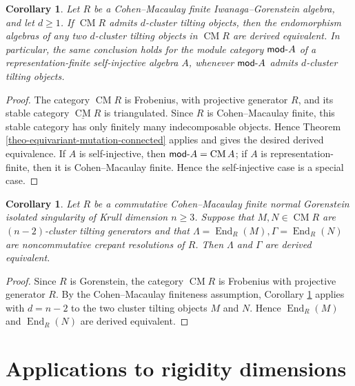 \documentclass[12pt]{article}
\theoremstyle{plain}
\newtheorem{Coro}[Def]{Corollary}
\theoremstyle{definition}
\DeclareMathOperator{\End}{End}
\def\modcat#1{{\sf mod}\mbox{-}{#1}}
\renewcommand{\geq}{\geqslant}
\begin{document}
\begin{Coro}\label{coro-finite-frobenius-derived-equivalence}
Let \(R\) be a Cohen--Macaulay finite Iwanaga--Gorenstein algebra, and let
\(d\geq1\).  If \(\operatorname{CM} R\) admits \(d\)-cluster tilting objects,
then the endomorphism algebras of any two \(d\)-cluster tilting objects in
\(\operatorname{CM} R\) are derived equivalent.  In particular, the same
conclusion holds for the module category \(\modcat{A}\) of a
representation-finite self-injective algebra \(A\), whenever \(\modcat{A}\)
admits \(d\)-cluster tilting objects.
\end{Coro}

\begin{proof}
The category \(\operatorname{CM} R\) is Frobenius, with projective generator
\(R\), and its stable category \(\underline{\operatorname{CM}}R\) is
triangulated.  Since \(R\) is Cohen--Macaulay finite, this stable category has
only finitely many indecomposable objects.  Hence Theorem
\ref{theo-equivariant-mutation-connected} applies and gives the desired
derived equivalence.  If \(A\) is self-injective, then
\(\modcat{A}=\operatorname{CM} A\); if \(A\) is representation-finite, then it
is Cohen--Macaulay finite.  Hence the self-injective case is a special case.
\end{proof}

\begin{Coro}\label{coro-CMfinite-isolated-NCCR}
Let \(R\) be a commutative Cohen--Macaulay finite normal Gorenstein isolated
singularity of Krull dimension \(n\geq3\).  Suppose that \(M,N\in
\operatorname{CM}R\) are \((n-2)\)-cluster tilting generators and that
\(
\Lambda=\End_R(M), \Gamma=\End_R(N)
\)
are noncommutative crepant resolutions of \(R\).  Then \(\Lambda\) and
\(\Gamma\) are derived equivalent.
\end{Coro}

\begin{proof}
Since \(R\) is Gorenstein, the category \(\operatorname{CM}R\) is Frobenius
with projective generator \(R\).  By the Cohen--Macaulay finiteness
assumption, Corollary \ref{coro-finite-frobenius-derived-equivalence} applies
with \(d=n-2\) to the two cluster tilting objects \(M\) and \(N\).  Hence
\(\End_R(M)\) and \(\End_R(N)\) are derived equivalent.  
\end{proof}


\section{Applications to rigidity dimensions}
\label{subsec-rigidity-dimension-self-injective}
\end{document}

